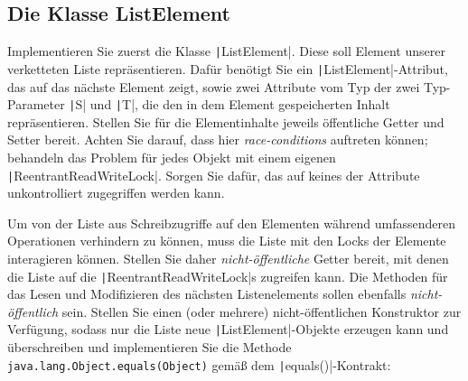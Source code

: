 \documentclass[11pt]{article} %
\newcommand{\code}[1]{\texttt|#1|}
\begin{document}
\subsection{Die Klasse ListElement}
Implementieren Sie zuerst die Klasse \code{ListElement}. Diese soll Element unserer verketteten Liste repräsentieren. Dafür benötigt Sie ein \code{ListElement}-Attribut, das auf das nächste Element zeigt, sowie zwei Attribute vom Typ der zwei Typ-Parameter \code{S} und \code{T}, die den in dem Element gespeicherten Inhalt repräsentieren. Stellen Sie für die Elementinhalte jeweils öffentliche Getter und Setter bereit. Achten Sie darauf, dass hier \emph{race-conditions} auftreten können; behandeln das Problem für jedes Objekt mit einem eigenen \code{ReentrantReadWriteLock}. Sorgen Sie dafür, das auf keines der Attribute unkontrolliert zugegriffen werden kann.\par
Um von der Liste aus Schreibzugriffe auf den Elementen während umfassenderen Operationen verhindern zu können, muss die Liste mit den Locks der Elemente interagieren können. Stellen Sie daher \emph{nicht-öffentliche} Getter bereit, mit denen die Liste auf die \code{ReentrantReadWriteLock}s zugreifen kann. Die Methoden für das Lesen und Modifizieren des nächsten Listenelements sollen ebenfalls \emph{nicht-öffentlich} sein.\newline
Stellen Sie einen (oder mehrere) nicht-öffentlichen Konstruktor zur Verfügung, sodass nur die Liste neue \code{ListElement}-Objekte erzeugen kann und überschreiben und implementieren Sie die Methode \texttt{java.lang.Object.equals(Object)} gemäß dem \code{equals()}-Kontrakt\cite[][S. 207]{Inden2015}:
\end{document}
